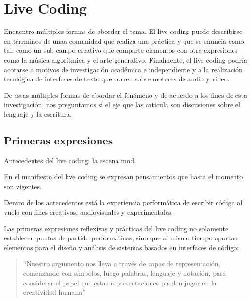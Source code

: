 
\section{Live Coding} %


Encuentro múltiples formas de abordar el tema. El live coding puede describirse en térrminos de unaa comunidad que realiza una práctica y que se enuncia como tal, como un sub-campo creativo que comparte elementos con otra expresiones como la música algorítmica y el arte generativo. Finalmente, el live coding podría acotarse a motivos de investigación académica e independiente y a la realización tecnlógica de interfaces de texto que corren sobre motores de audio y video.

De estas múltiples formas de abordar el fenómeno y de acuerdo a los fines de esta investigación, nos preguntamos si el eje que las articula son discusiones sobre el lenguaje y la escritura. 

\subsection{Primeras expresiones}

Antecedentes del live coding: la escena mod.

En el manifiesto del live coding se expresan pensamientos que hasta el momento, son vigentes. 

Dentro de los antecedentes está la experiencia performática de escribir código al vuelo con fines creativos, audiovisuales y experimentales.

Las primeras expresiones reflexivas y prácticas del live coding no solamente establecen puntos de partida performáticas, sino que al mismo tiempo aportan elementos para el diseño y análisis de sistemas basados en interfaces de código:

\begin{quote}

  ``Nuestro argumento nos lleva a través de capas de representación, comenzando con símbolos, luego palabras, lenguaje y notación, para considerar el papel que estas representaciones pueden jugar en la creatividad humana'' \citep[p.~3]{McLean2011}

\end{quote}

